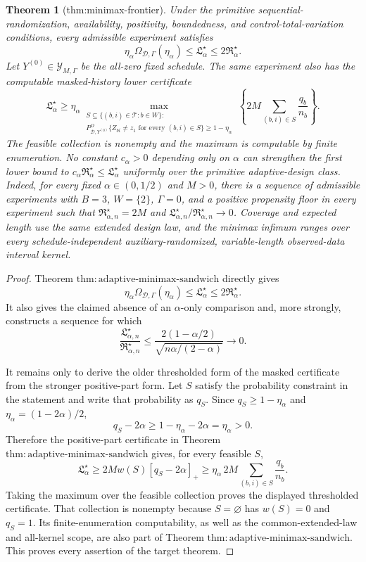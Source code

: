 \documentclass{article}
\newtheorem{theorem}{Theorem}
\begin{document}
\begin{theorem}[thm:minimax-frontier]\label{thm:minimax-frontier}
Under the primitive sequential-randomization, availability, positivity, boundedness, and control-total-variation conditions, every admissible experiment satisfies
\[
 \eta_\alpha\Omega_{\mathcal D,\Gamma}(\eta_\alpha)
 \le \mathfrak L_\alpha^\star
 \le 2\mathfrak R_\alpha^\star.
\]
Let \(Y^{(0)}\in\mathcal Y_{M,\Gamma}\) be the all-zero fixed schedule. The same experiment also has the computable masked-history lower certificate
\[
 \mathfrak L_\alpha^\star
 \ge \eta_\alpha
 \max_{\substack{S\subseteq\{(b,i)\in\mathcal T:b\in W\}:\\ P^O_{\mathcal D,Y^{(0)}}\{Z_{bi}\ne z_1\text{ for every }(b,i)\in S\}\ge1-\eta_\alpha}}
 \left\{2M\sum_{(b,i)\in S}\frac{q_b}{n_b}\right\}.
\]
The feasible collection is nonempty and the maximum is computable by finite enumeration. No constant \(c_\alpha>0\) depending only on \(\alpha\) can strengthen the first lower bound to \(c_\alpha\mathfrak R_\alpha^\star\le\mathfrak L_\alpha^\star\) uniformly over the primitive adaptive-design class. Indeed, for every fixed \(\alpha\in(0,1/2)\) and \(M>0\), there is a sequence of admissible experiments with \(B=3\), \(W=\{2\}\), \(\Gamma=0\), and a positive propensity floor in every experiment such that \(\mathfrak R_{\alpha,n}^\star=2M\) and \(\mathfrak L_{\alpha,n}^\star/\mathfrak R_{\alpha,n}^\star\to0\). Coverage and expected length use the same extended design law, and the minimax infimum ranges over every schedule-independent auxiliary-randomized, variable-length observed-data interval kernel.
\end{theorem}
\begin{proof}
Theorem \(\mathrm{thm:adaptive\text{-}minimax\text{-}sandwich}\) directly gives
\[
 \eta_\alpha\Omega_{\mathcal D,\Gamma}(\eta_\alpha)
 \le\mathfrak L_\alpha^\star
 \le2\mathfrak R_\alpha^\star.
\]
It also gives the claimed absence of an \(\alpha\)-only comparison and, more strongly, constructs a sequence for which
\[
 \frac{\mathfrak L_{\alpha,n}^\star}{\mathfrak R_{\alpha,n}^\star}
 \le
 \frac{2(1-\alpha/2)}{\sqrt{n\alpha/(2-\alpha)}}
 \longrightarrow0.
\]

It remains only to derive the older thresholded form of the masked certificate from the stronger positive-part form.  Let \(S\) satisfy the probability constraint in the statement and write that probability as \(q_S\).  Since \(q_S\ge1-\eta_\alpha\) and \(\eta_\alpha=(1-2\alpha)/2\),
\[
 q_S-2\alpha
 \ge1-\eta_\alpha-2\alpha
 =\eta_\alpha>0.
\]
Therefore the positive-part certificate in Theorem \(\mathrm{thm:adaptive\text{-}minimax\text{-}sandwich}\) gives, for every feasible \(S\),
\[
 \mathfrak L_\alpha^\star
 \ge2Mw(S)[q_S-2\alpha]_+
 \ge\eta_\alpha\,2M
 \sum_{(b,i)\in S}\frac{q_b}{n_b}.
\]
Taking the maximum over the feasible collection proves the displayed thresholded certificate.  That collection is nonempty because \(S=\varnothing\) has \(w(S)=0\) and \(q_S=1\).  Its finite-enumeration computability, as well as the common-extended-law and all-kernel scope, are also part of Theorem \(\mathrm{thm:adaptive\text{-}minimax\text{-}sandwich}\).  This proves every assertion of the target theorem.
\end{proof}
\end{document}
